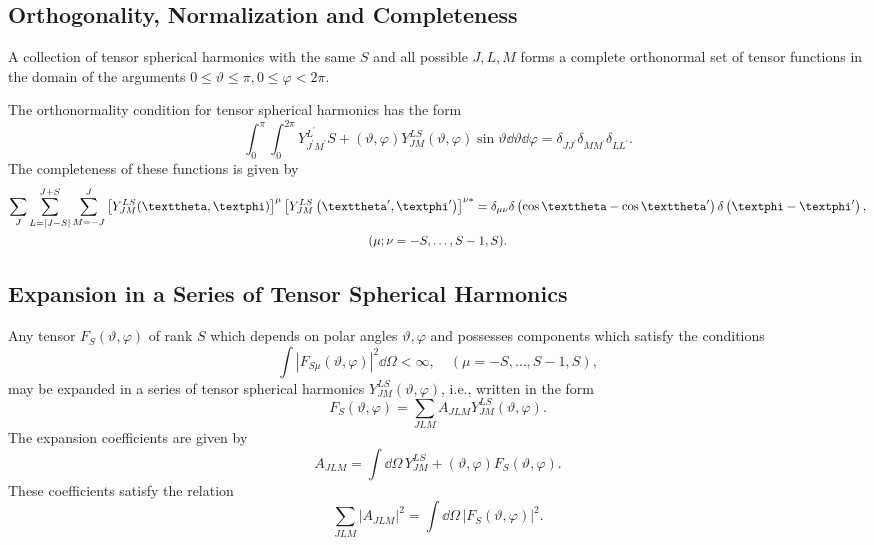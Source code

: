 \subsection{Orthogonality, Normalization and Completeness}\label{sec:7.1.8}
A collection of tensor spherical harmonics with the same $S$ and all possible $J, L, M$ forms a complete orthonormal set of tensor functions in the domain of the arguments $0 \leq \vartheta \leq \pi, 0 \leq \varphi<2 \pi$.

The orthonormality condition for tensor spherical harmonics has the form
\begin{equation}
\int_{0}^{\pi} \int_{0}^{2 \pi} Y_{J^{\prime} M^{\prime}}^{L^{\prime}} S+(\vartheta, \varphi) Y_{J M}^{L S}(\vartheta, \varphi) \sin \vartheta \dd \vartheta \dd \varphi=\delta_{J J^{\prime}} \delta_{M M^{\prime}} \delta_{L L^{\prime}}. \label{eq:7:1:43}
\end{equation}
The completeness of these functions is given by
\begin{gather}
\sum_{J} \sum_{L=|J-S|}^{J+S} \sum_{M=-J}^{J}\left[Y_{J M}^{L S}(\vartheta, \varphi)\right]^{\mu}\left[Y_{J M}^{L S}\left(\vartheta^{\prime}, \varphi^{\prime}\right)\right]^{\nu *}=\delta_{\mu \nu} \delta\left(\cos \vartheta-\cos \vartheta^{\prime}\right) \delta\left(\varphi-\varphi^{\prime}\right), \label{eq:7:1:44}\\
(\mu ; \nu=-S, \ldots, S-1, S). \notag
\end{gather}
\subsection{Expansion in a Series of Tensor Spherical Harmonics}\label{sec:7.1.9}
Any tensor $F_{S}(\vartheta, \varphi)$ of rank $S$ which depends on polar angles $\vartheta, \varphi$ and possesses components which satisfy the conditions
\begin{equation}
\int\left|F_{S \mu}(\vartheta, \varphi)\right|^{2} \dd \Omega<\infty, \quad(\mu=-S, \ldots, S-1, S), \label{eq:7:1:45}
\end{equation}
may be expanded in a series of tensor spherical harmonics $Y_{J M}^{L S}(\vartheta, \varphi)$, i.e., written in the form
\begin{equation}
F_{S}(\vartheta, \varphi)=\sum_{J L M} A_{J L M} Y_{J M}^{L S}(\vartheta, \varphi). \label{eq:7:1:46}
\end{equation}
The expansion coefficients are given by
\begin{equation}
A_{J L M}=\int \dd \Omega\, Y_{J M}^{L S}+(\vartheta, \varphi) F_{S}(\vartheta, \varphi). \label{eq:7:1:47}
\end{equation}
These coefficients satisfy the relation
\begin{equation}
\sum_{J L M}\left|A_{J L M}\right|^{2}=\int \dd \Omega\,\left|F_{S}(\vartheta, \varphi)\right|^{2}. \label{eq:7:1:48}
\end{equation}
